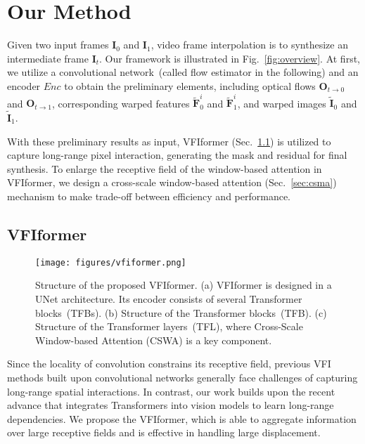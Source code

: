 \documentclass[10pt,twocolumn,letterpaper]{article}
\begin{document}
	


	
	
	\section{Our Method}
	
	
	Given two input frames $\bm{I}_0$ and $\bm{I}_1$, video frame interpolation is to synthesize an intermediate frame $\bm{I}_t$. Our framework is illustrated in Fig.~\ref{fig:overview}. At first, we utilize a convolutional network~(called flow estimator in the following) and an encoder $Enc$ to obtain the preliminary elements, including optical flows $\bm{O}_{t\rightarrow0}$ and $\bm{O}_{t\rightarrow1}$, corresponding warped features $\widetilde{\bm{F}}_{0}^{i}$ and $\widetilde{\bm{F}}_{1}^{i}$, and warped images $\widetilde{\bm{I}}_{0}$ and $\widetilde{\bm{I}}_{1}$. 
	
	With these preliminary results as input, VFIformer (Sec.~\ref{sec:vfiformer}) is utilized to capture long-range pixel interaction, generating the mask and residual for final synthesis. To enlarge the receptive field of the window-based attention in VFIformer, we design a cross-scale window-based attention (Sec.~\ref{sec:csma}) mechanism to make trade-off between efficiency and performance.
	
	
	
	\subsection{VFIformer}
	\label{sec:vfiformer}
	
	\begin{figure*}[t]
		\begin{center}
			\texttt{[image: figures/vfiformer.png]}
		\end{center}
\caption{Structure of the proposed VFIformer. (a) VFIformer is designed in a UNet architecture. Its encoder consists of several Transformer blocks~(TFBs). (b) Structure of the Transformer blocks~(TFB). (c) Structure of the Transformer layers~(TFL), where Cross-Scale Window-based Attention (CSWA) is a key component.}
		\label{fig:fe_transformer}
		\vspace{-0.1in}
	\end{figure*}
	
	
	Since the locality of convolution constrains its receptive field, previous VFI methods built upon convolutional networks generally face challenges of capturing long-range spatial interactions. In contrast, our work builds upon the recent advance that integrates Transformers into vision models to learn long-range dependencies. We propose the VFIformer, which is able to aggregate information over large receptive fields and is effective in handling large  displacement.
	
\end{document}
